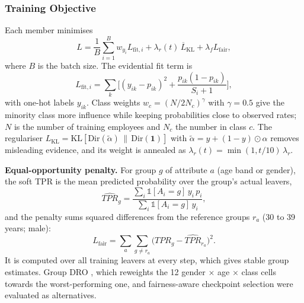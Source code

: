\documentclass[conference]{IEEEtran}
\begin{document}
\subsubsection{Training Objective}
Each member minimises
\begin{equation}
L=\frac{1}{B}\sum_{i=1}^{B}w_{y_i}L_{\mathrm{fit},i}+\lambda_r(t)\,\overline{L}_{\mathrm{KL}}+\lambda_f L_{\mathrm{fair}},
\end{equation}
where $B$ is the batch size. The evidential fit term \cite{sensoy2018} is
\begin{equation}
L_{\mathrm{fit},i}=\sum_{k}\Big[(y_{ik}-p_{ik})^2+\frac{p_{ik}(1-p_{ik})}{S_i+1}\Big],
\end{equation}
with one-hot labels $y_{ik}$. Class weights $w_c=(N/2N_c)^{\gamma}$ with $\gamma=0.5$ give the minority class more influence while keeping probabilities close to observed rates; $N$ is the number of training employees and $N_c$ the number in class $c$. The regulariser $L_{\mathrm{KL}}=\mathrm{KL}[\mathrm{Dir}(\tilde\alpha)\,\|\,\mathrm{Dir}(\mathbf{1})]$ with $\tilde\alpha=y+(1-y)\odot\alpha$ removes misleading evidence, and its weight is annealed as $\lambda_r(t)=\min(1,t/10)\,\lambda_r$.

\textbf{Equal-opportunity penalty.} For group $g$ of attribute $a$ (age band or gender), the soft TPR is the mean predicted probability over the group's actual leavers,
\begin{equation}
\widehat{TPR}_g=\frac{\sum_i \mathbb{1}[A_i=g]\,y_i\,p_i}{\sum_i \mathbb{1}[A_i=g]\,y_i},
\end{equation}
and the penalty sums squared differences from the reference groups $r_a$ (30 to 39 years; male):
\begin{equation}
L_{\mathrm{fair}}=\sum_{a}\sum_{g\neq r_a}\big(\widehat{TPR}_g-\widehat{TPR}_{r_a}\big)^2.
\end{equation}
It is computed over all training leavers at every step, which gives stable group estimates. Group DRO \cite{sagawa2020}, which reweights the 12 gender $\times$ age $\times$ class cells towards the worst-performing one, and fairness-aware checkpoint selection were evaluated as alternatives.
\end{document}
